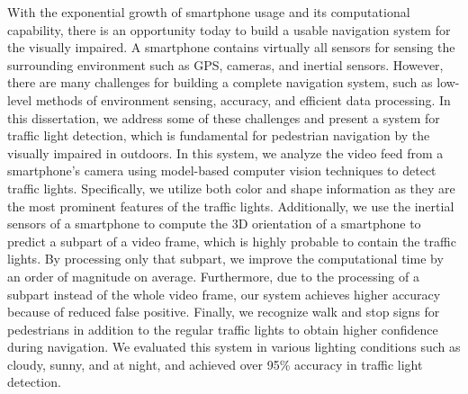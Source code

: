 \summary

With the exponential growth of smartphone usage and its computational capability, there is an opportunity today to build a usable navigation system for the visually impaired. 
A smartphone contains virtually all sensors for sensing the surrounding environment such as GPS, cameras, and inertial sensors. 
However, there are many challenges for building a complete navigation system, such as low-level methods of environment sensing, accuracy, and efficient data processing.
In this dissertation, we address some of these challenges and present a system for traffic light detection, which is fundamental for pedestrian navigation by the visually impaired in outdoors. 
In this system, we analyze the video feed from a smartphone's camera using model-based computer vision techniques to detect traffic lights. 
Specifically, we utilize both color and shape information as they are the most prominent features of the traffic lights.
Additionally, we use the inertial sensors of a smartphone to compute the 3D orientation of a smartphone to predict a subpart of a video frame, which is highly probable to contain the traffic lights. 
By processing only that subpart, we improve the computational time by an order of magnitude on average. 
Furthermore, due to the processing of a subpart instead of the whole video frame, our system achieves higher accuracy because of reduced false positive.
Finally, we recognize walk and stop signs for pedestrians in addition to the regular traffic lights to obtain higher confidence during navigation. 
We evaluated this system in various lighting conditions such as cloudy, sunny, and at night, and achieved over 95\% accuracy in traffic light detection.  


